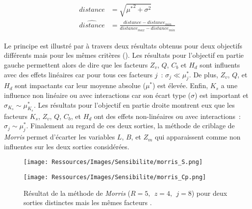 \begin{align}\label{eq:distance_norm}
    \begin{split}
        distance        &= \sqrt{{\mu^{*}}^2 + \sigma^{2}} \\
        \hat{distance}  &=  \frac{distance - distance_{min}}{distance_{max} - distance_{min}}
    \end{split}
\end{align}

Le principe est illustré par \textcite{Iooss2011} à travers deux résultats obtenus
pour deux objectifs différents mais pour les mêmes critères ().
Les résultats pour l’objectif en partie gauche permettent alors de dire que
les facteurs $Z_{v}$, $Q$, $C_{b}$ et $H_{d}$ sont influents
avec des effets linéaires car pour tous ces facteurs $j$~: $\sigma_{j} \ll \mu^{*}_{j}$.
De plus, $Z_{v}$, $Q$, et $H_{d}$ sont impactants car leur moyenne absolue ($\mu^{*}$) est élevée.
Enfin, $K_{s}$ a une influence non linéaire ou avec interactions car son écart type ($\sigma$)
est important et  $\sigma_{K_{s}} \sim \mu^{*}_{K_{s}}$.
Les résultats pour l’objectif en partie droite montrent eux que les facteurs $K_{s}$, $Z_{v}$, $Q$, $C_{b}$,
et $H_{d}$ ont des effets non-linéaires ou avec interactions~: $\sigma_{j} \sim
\mu^{*}_{j}$. Finalement au regard de ces deux sorties, la méthode de criblage de \textit{Morris}
permet d’écarter les variables $L$, $B$, et $Z_{m}$ qui apparaissent comme non influentes
sur les deux sorties considérées.

\begin{figure}
    \centering
    \begin{minipage}{.45\textwidth}
      \texttt{[image: Ressources/Images/Sensibilite/morris\_S.png]}
    \end{minipage}
    \hfill
    \begin{minipage}{.45\textwidth}
      \texttt{[image: Ressources/Images/Sensibilite/morris\_Cp.png]}
    \end{minipage}
  \caption[Exemple de résultats de la méthode de Morris]
          {Résultat de la méthode de \textit{Morris} ($R = 5,~~ z = 4,~~ j=8$) pour deux
           sorties distinctes mais les mêmes facteurs \parencite{Iooss2011}.}
  \label{fig:meth_graph_morris}
\end{figure}



